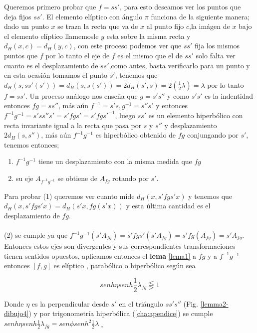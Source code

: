Queremos primero probar que $f=ss'$, para esto deseamos ver los puntos que deja fijos $ss'$. El elemento el\'iptico con \'angulo $\pi$ funciona de la
siguiente manera; dado un punto $x$ se traza la recta que va de $x$
al punto fijo $c$,la im\'agen de $x$ bajo el elemento el\'iptico llamemosle $y$ esta
sobre la misma recta y $d_{H}(x,c)=d_{H}(y,c)$, con este proceso
podemos ver que $ss'$ fija los mismos puntos que $f$ por lo tanto el
eje de $f$ es el mismo que el  de $ss'$ solo falta ver cuanto es el
desplazamiento de $ss'$,como antes, basta verificarlo para un
punto y en esta ocasi\'on tomamos el punto $s'$, tenemos que
$d_{H}(s,ss'(s'))=d_{H}(s,s(s'))= 2d_{H}(s',s)=2(\frac{1}{2}
\lambda)= \lambda $ por lo tanto $f=ss'$. Un proceso an\'alogo nos
enseña que $g=s's''$ y como $s's'$ es la indentidad entonces $fg
= ss''$, m\'as a\'un $f^{-1} = s's,g^{-1}=s''s'$ y entonces
$f^{-1}g^{-1}= s'ss''s'=s'fgs'=s'fgs'^{-1}$, luego $ss'$ es un
elemento hiperb\'olico con recta invariante igual a la recta que pasa por
$s$ y $s''$ y desplazamiento $2d_{H}(s,s'')$, m\'as a\'un
$f^{-1}g^{-1}$ es hiperb\'olico obtenido de $fg$ conjungando por
$s'$, tenemos entonces;

\begin{enumerate}
\item $f^{-1}g^{-1}$ tiene un desplazamiento con la misma medida que
$fg$
\item su eje $A_{f^{-1}g^{-1}}$ se obtiene de $A_{fg}$ rotando por $s'$.
\end{enumerate}

Para probar (1) queremos ver cuanto mide $d_{H}(x,s'fgs'x)$ y
tenemos que $d_{H}(x,s'fgs'x)= d_{H}(s'x,fg(s'x))$ y esta \'ultima
cantidad es el desplazamiento de $fg$. \\ \\

(2) se cumple  ya que $f^{-1}g^{-1} (s'A_{fg})= s'fgs'(s'A_{fg})=
s'fg(A_{fg})=s'A_{fg}$. \\

Entonces estos ejes son divergentes y sus correspondientes
transformaciones tienen sentidos opuestos, aplicamos entonces el
\textbf{lema} \ref{lema1} a $fg$ y a $f^{-1}g^{-1}$ entonces $[f,g]$ es
el\'iptico , parab\'olico o hiperb\'olico seg\'un sea

$$senh \eta senh \frac{1}{2} \lambda_{fg} \lesseqgtr 1$$

Donde $\eta$ es la perpendicular desde $s'$ en el tri\'angulo
$ss's''$ (Fig. \ref{lemma2-dibujo4}) y por trigonometr\'ia hiperb\'olica (\ref{cha:apendice}) se cumple $senh \eta
senh\frac{1}{2} \lambda_{fg} = sen \phi senh^{2} \frac{1}{2}\lambda$
$_{\square}$


